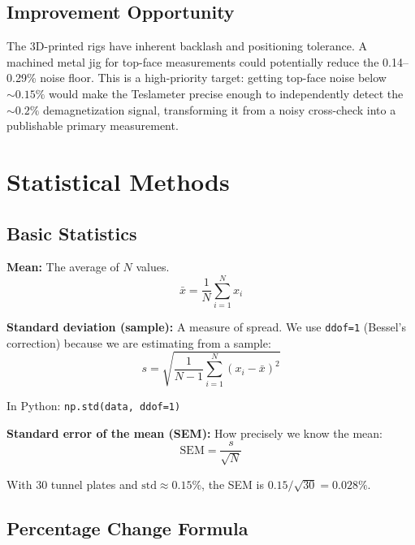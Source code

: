 \documentclass[11pt,letterpaper]{article}
\begin{document}
\subsection{Improvement Opportunity}

The 3D-printed rigs have inherent backlash and positioning tolerance. A machined
metal jig for top-face measurements could potentially reduce the 0.14--0.29\%
noise floor. This is a high-priority target: getting top-face noise below
${\sim}0.15\%$ would make the Teslameter precise enough to independently detect
the ${\sim}0.2\%$ demagnetization signal, transforming it from a noisy
cross-check into a publishable primary measurement.


\section{Statistical Methods}
\label{sec:stats}

\subsection{Basic Statistics}

\textbf{Mean:} The average of $N$ values.
\begin{equation*}
\bar{x} = \frac{1}{N} \sum_{i=1}^{N} x_i
\end{equation*}

\textbf{Standard deviation (sample):} A measure of spread. We use
\texttt{ddof=1} (Bessel's correction) because we are estimating from a sample:
\begin{equation*}
s = \sqrt{\frac{1}{N-1} \sum_{i=1}^{N} (x_i - \bar{x})^2}
\end{equation*}

In Python: \texttt{np.std(data, ddof=1)}

\textbf{Standard error of the mean (SEM):} How precisely we know the mean:
\begin{equation*}
\mathrm{SEM} = \frac{s}{\sqrt{N}}
\end{equation*}

With 30 tunnel plates and $\mathrm{std} \approx 0.15\%$, the SEM is
$0.15/\sqrt{30} = 0.028\%$.

\subsection{Percentage Change Formula}
\end{document}
